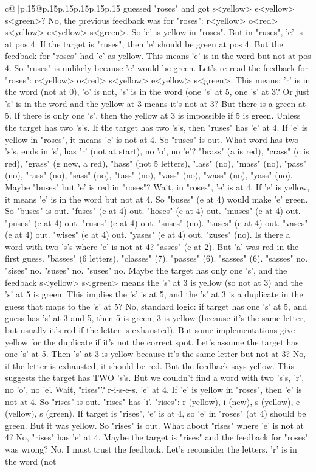 \documentclass{article}
\begin{document}
{\begin{supertabular}{c@{$\;$}|p{.15\linewidth}@{}p{.15\linewidth}p{.15\linewidth}p{.15\linewidth}p{.15\linewidth}p{.15\linewidth}}
{{{guessed "roses" and got s<yellow> e<yellow> s<green>? No, the previous feedback was for "roses": r<yellow> o<red> s<yellow> e<yellow> s<green>. So 'e' is yellow in "roses". But in "ruses", 'e' is at pos 4. If the target is "ruses", then 'e' should be green at pos 4. But the feedback for "roses" had 'e' as yellow. This means 'e' is in the word but not at pos 4. So "ruses" is unlikely because 'e' would be green. Let's re{-}read the feedback for "roses": r<yellow> o<red> s<yellow> e<yellow> s<green>. This means: 'r' is in the word (not at 0), 'o' is not, 's' is in the word (one 's' at 5, one 's' at 3? Or just 's' is in the word and the yellow at 3 means it's not at 3? But there is a green at 5. If there is only one 's', then the yellow at 3 is impossible if 5 is green. Unless the target has two 's's. If the target has two 's's, then "ruses" has 'e' at 4. If 'e' is yellow in "roses", it means 'e' is not at 4. So "ruses" is out. What word has two 's's, ends in 's', has 'r' (not at start), no 'o', no 'e'? "brass" (a is red), "crass" (c is red), "grass" (g new, a red), "hass" (not 5 letters), "lass" (no), "mass" (no), "pass" (no), "rass" (no), "sass" (no), "tass" (no), "vass" (no), "wass" (no), "yass" (no). Maybe "buses" but 'e' is red in "roses"? Wait, in "roses", 'e' is at 4. If 'e' is yellow, it means 'e' is in the word but not at 4. So "buses" (e at 4) would make 'e' green. So "buses" is out. "fuses" (e at 4) out. "hoses" (e at 4) out. "muses" (e at 4) out. "puses" (e at 4) out. "ruses" (e at 4) out. "suses" (no). "tuses" (e at 4) out. "vases" (e at 4) out. "wises" (e at 4) out. "yases" (e at 4) out. "zuses" (no). Is there a word with two 's's where 'e' is not at 4? "asses" (e at 2). But 'a' was red in the first guess. "basses" (6 letters). "classes" (7). "passes" (6). "sasses" (6). "sasses" no. "sises" no. "suses" no. "suses" no. Maybe the target has only one 's', and the feedback s<yellow> s<green> means the 's' at 3 is yellow (so not at 3) and the 's' at 5 is green. This implies the 's' is at 5, and the 's' at 3 is a duplicate in the guess that maps to the 's' at 5? No, standard logic: if target has one 's' at 5, and guess has 's' at 3 and 5, then 5 is green, 3 is yellow (because it's the same letter, but usually it's red if the letter is exhausted). But some implementations give yellow for the duplicate if it's not the correct spot. Let's assume the target has one 's' at 5. Then 's' at 3 is yellow because it's the same letter but not at 3? No, if the letter is exhausted, it should be red. But the feedback says yellow. This suggests the target has TWO 's's. But we couldn't find a word with two 's's, 'r', no 'o', no 'e'. Wait, "rises"? r{-}i{-}s{-}e{-}s. 'e' at 4. If 'e' is yellow in "roses", then 'e' is not at 4. So "rises" is out. "rises" has 'i'. "rises": r (yellow), i (new), s (yellow), e (yellow), s (green). If target is "rises", 'e' is at 4, so 'e' in "roses" (at 4) should be green. But it was yellow. So "rises" is out. What about "rises" where 'e' is not at 4? No, "rises" has 'e' at 4. Maybe the target is "rises" and the feedback for "roses" was wrong? No, I must trust the feedback. Let's reconsider the letters. 'r' is in the word (not }}}
\end{supertabular}}
\end{document}
